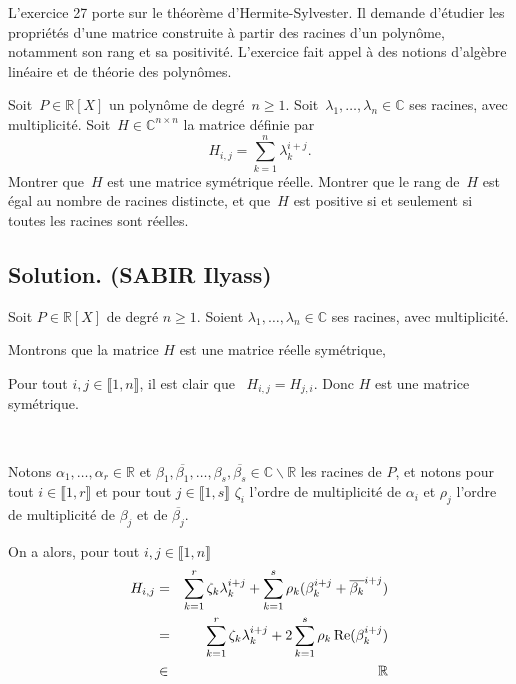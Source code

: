L'exercice 27 porte sur le th{\'e}or{\`e}me d'Hermite-Sylvester. Il demande
d'{\'e}tudier les propri{\'e}t{\'e}s d'une matrice construite {\`a} partir des
racines d'un polyn{\^o}me, notamment son rang et sa positivit{\'e}. L'exercice
fait appel {\`a} des notions d'alg{\`e}bre lin{\'e}aire et de th{\'e}orie des
polyn{\^o}mes.
\begin{exercise}
Soit~$P \in \mathbb{R} [X]$ un polyn{\^o}me de degr{\'e}~$n \geq 1$.
Soit~$\lambda_1, \ldots, \lambda_n \in \mathbb{C}$ ses racines, avec
multiplicit{\'e}. Soit~$H \in \mathbb{C}^{n \times n}$ la matrice d{\'e}finie
par
\[ H_{i, j} = \sum_{k = 1}^n \lambda_k^{i + j} . \]
Montrer que~$H$ est une matrice sym{\'e}trique r{\'e}elle. Montrer que le rang
de~$H$ est {\'e}gal au nombre de racines distincte, et que~$H$ est positive si
et seulement si toutes les racines sont r{\'e}elles.

\end{exercise}

\subsection*{Solution. (SABIR Ilyass)}

Soit $P \in \mathbb{R} [X]$ de degr{\'e} $n \geqslant 1$. Soient $\lambda_1,
\ldots, \lambda_n \in \mathbb{C}$ ses racines, avec multiplicit{\'e}.

Montrons que la matrice $H$ est une matrice r{\'e}elle sym{\'e}trique,

Pour tout $i, j \in \llbracket 1, n \rrbracket$, il est clair que \ $H_{i, j}
= H_{j, i}$. Donc $H$ est une matrice sym{\'e}trique.

\

Notons $\alpha_1, \ldots, \alpha_r \in \mathbb{R}$ et $\beta_1,
\overline{\beta_1}, \ldots, \beta_s, \overline{\beta_s} \in \mathbb{C}
\backslash \mathbb{R}$ les racines de $P$, et notons pour tout $i \in
\llbracket 1, r \rrbracket$ et pour tout $j \in \llbracket 1, s \rrbracket$
$\zeta_i$ l'ordre de multiplicit{\'e} de $\alpha_i$ et $\rho_j$ l'ordre de
multiplicit{\'e} de $\beta_j$ et de $\overline{{\beta_j} }$.

On a alors, pour tout $i, j \in \llbracket 1, n \rrbracket$
\begin{eqnarray*}
  H_{i, j} & = & \sum_{k = 1}^r {\zeta_k}  \lambda_k^{i + j} + \sum_{k = 1}^s
  \rho_k (\beta_k^{i + j} + \overline{{\beta_k}  }^{i + j})\\
  & = & \sum_{k = 1}^r {\zeta_k}  \lambda_k^{i + j} + 2 \sum_{k = 1}^s \rho_k
  \operatorname{Re} (\beta_k^{i + j})\\
  & \in & \mathbb{R}
\end{eqnarray*}


